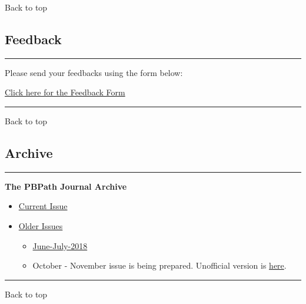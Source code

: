 \documentclass[]{article}
\begin{document}
Back to top

\pagebreak

\hypertarget{feedback}{%
\subsection{Feedback}\label{feedback}}

\begin{center}\rule{0.5\linewidth}{\linethickness}\end{center}

Please send your feedbacks using the form below:

\href{https://docs.google.com/forms/d/e/1FAIpQLSeD3Z9J6Y7eMmiyM12f_SfAmHUlykb1zxZcwO6lg7cebGYQIQ/viewform}{Click
here for the Feedback Form}

\begin{center}\rule{0.5\linewidth}{\linethickness}\end{center}

Back to top

\pagebreak

\hypertarget{archive}{%
\subsection{Archive}\label{archive}}

\begin{center}\rule{0.5\linewidth}{\linethickness}\end{center}

\textbf{The PBPath Journal Archive}

\begin{itemize}
\item
  \href{http://pbpath.org/journal-watch/}{Current Issue}
\item
  \href{http://pbpath.org/journal-watch-archive/}{Older Issues}

  \begin{itemize}
  \item
    \href{http://pbpath.org/pbpath-journal-watch-june-july-2018/}{June-July-2018}
  \item
    October - November issue is being prepared. Unofficial version is
    \href{http://pbpath.org/journal-watch-upcoming-issue/}{here}.
  \end{itemize}
\end{itemize}

\begin{center}\rule{0.5\linewidth}{\linethickness}\end{center}

Back to top
\end{document}
